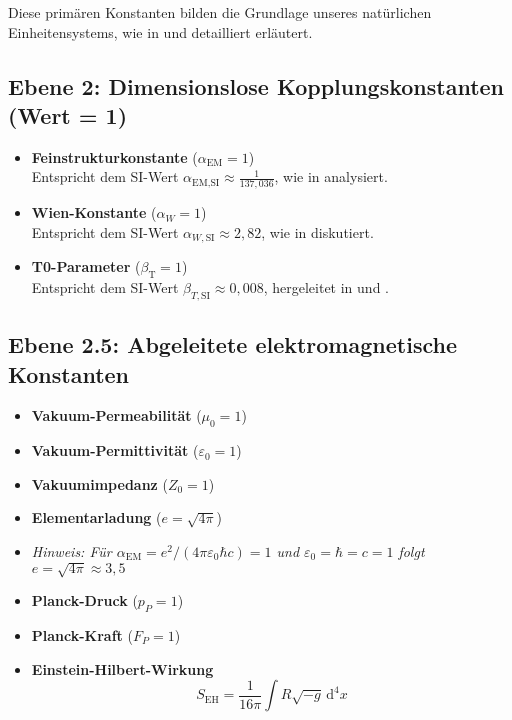 \documentclass[12pt,a4paper]{article}
\newcommand{\alphaEM}{\alpha_{\text{EM}}}
\newcommand{\betaT}{\beta_{\text{T}}}
\newcommand{\alphaEMSI}{\alpha_{\text{EM,SI}}}
\begin{document}
Diese primären Konstanten bilden die Grundlage unseres natürlichen Einheitensystems, wie in \cite{pascher_planck_2025} und \cite{pascher_alphabeta_2025} detailliert erläutert.

\subsection*{Ebene 2: Dimensionslose Kopplungskonstanten (Wert = 1)}
\begin{itemize}[itemsep=0.5em]
	\item \textbf{Feinstrukturkonstante} (\(\alphaEM = 1\)) \\
	Entspricht dem SI-Wert \(\alphaEMSI \approx \frac{1}{137,036}\), wie in \cite{pascher_alpha_2025} analysiert.
	\item \textbf{Wien-Konstante} (\(\alpha_W = 1\)) \\
	Entspricht dem SI-Wert \(\alpha_{W,\mathrm{SI}} \approx 2,82\), wie in \cite{pascher_temp_2025} diskutiert.
	\item \textbf{T0-Parameter} (\(\betaT = 1\)) \\
	Entspricht dem SI-Wert \(\beta_{T,\mathrm{SI}} \approx 0,008\), hergeleitet in \cite{pascher_params_2025} und \cite{pascher_alphabeta_2025}.
\end{itemize}

\subsection*{Ebene 2.5: Abgeleitete elektromagnetische Konstanten}
\begin{itemize}[itemsep=0.5em]
	\item \textbf{Vakuum-Permeabilität} (\(\mu_0 = 1\))
	\item \textbf{Vakuum-Permittivität} (\(\varepsilon_0 = 1\))
	\item \textbf{Vakuumimpedanz} (\(Z_0 = 1\))
	\item \textbf{Elementarladung} (\(e = \sqrt{4\pi}\))
	\item[] \textit{Hinweis: Für $\alphaEM = e^2/(4\pi\varepsilon_0\hbar c) = 1$ und $\varepsilon_0 = \hbar = c = 1$ folgt $e = \sqrt{4\pi} \approx 3,5$}
	\item \textbf{Planck-Druck} (\(p_P = 1\))
	\item \textbf{Planck-Kraft} (\(F_P = 1\))
	\item \textbf{Einstein-Hilbert-Wirkung}
	\[
	S_{\mathrm{EH}} = \frac{1}{16\pi} \int R \sqrt{-g} \, \mathrm{d}^4x
	\]
\end{itemize}
\end{document}
